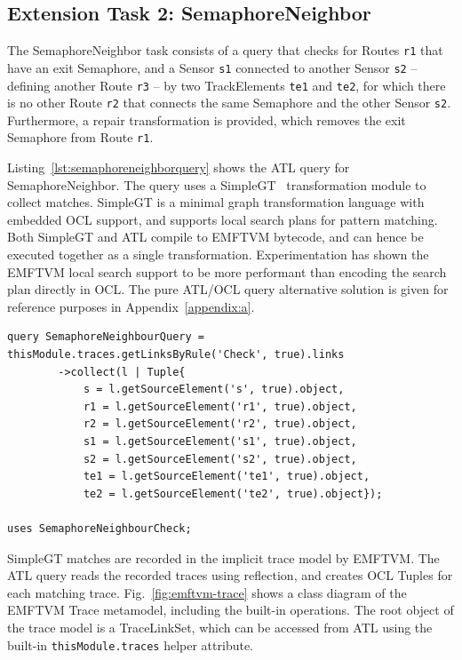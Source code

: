 \documentclass[submission,copyright,creativecommons]{eptcs}
\begin{document}
\subsection{Extension Task 2: SemaphoreNeighbor}

The SemaphoreNeighbor task consists of a query that checks for Routes \texttt{r1} that have an exit Semaphore, and a Sensor \texttt{s1} connected to another Sensor \texttt{s2} -- defining another Route \texttt{r3} -- by two TrackElements \texttt{te1} and \texttt{te2}, for which there is no other Route \texttt{r2} that connects the same Semaphore and the other Sensor \texttt{s2}. Furthermore, a repair transformation is provided, which removes the exit Semaphore from Route \texttt{r1}.

Listing~\ref{lst:semaphoreneighborquery} shows the ATL query for SemaphoreNeighbor. The query uses a SimpleGT~\cite{conf/models/Wagelaar2011} transformation module to collect matches. SimpleGT is a minimal graph transformation language with embedded OCL support, and supports local search plans for pattern matching. Both SimpleGT and ATL compile to EMFTVM bytecode, and can hence be executed together as a single transformation. Experimentation has shown the EMFTVM local search support to be more performant than encoding the search plan directly in OCL. The pure ATL/OCL query alternative solution is given for reference purposes in Appendix~\ref{appendix:a}.

\lstset{language=atl}
\begin{lstlisting}[float=htb, caption={SemaphoreNeighborQuery in ATL}, label=lst:semaphoreneighborquery, captionpos=b, frame=tb, belowskip=-10pt]
query SemaphoreNeighbourQuery = thisModule.traces.getLinksByRule('Check', true).links
		->collect(l | Tuple{
			s = l.getSourceElement('s', true).object,
			r1 = l.getSourceElement('r1', true).object,
			r2 = l.getSourceElement('r2', true).object,
			s1 = l.getSourceElement('s1', true).object,
			s2 = l.getSourceElement('s2', true).object,
			te1 = l.getSourceElement('te1', true).object,
			te2 = l.getSourceElement('te2', true).object});

uses SemaphoreNeighbourCheck;
\end{lstlisting}

SimpleGT matches are recorded in the implicit trace model by EMFTVM. The ATL query reads the recorded traces using reflection, and creates OCL Tuples for each matching trace. Fig.~\ref{fig:emftvm-trace} shows a class diagram of the EMFTVM Trace metamodel, including the built-in operations. The root object of the trace model is a TraceLinkSet, which can be accessed from ATL using the built-in \texttt{thisModule.traces} helper attribute.
\end{document}
